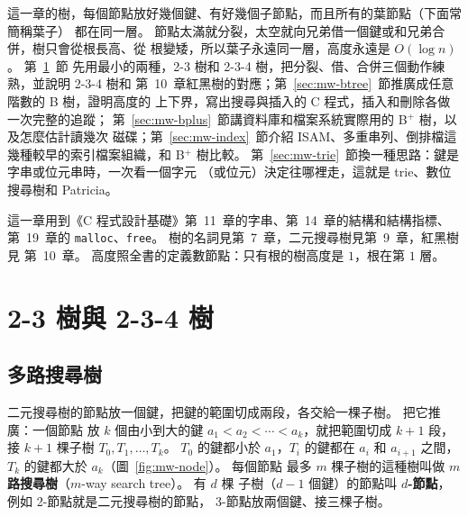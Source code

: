 這一章的樹，每個節點放好幾個鍵、有好幾個子節點，而且所有的葉節點（下面常簡稱葉子）
都在同一層。 節點太滿就分裂，太空就向兄弟借一個鍵或和兄弟合併，樹只會從根長高、從
根變矮，所以葉子永遠同一層，高度永遠是 $O(\log n)$。 第~\ref{sec:mw-23}~節
先用最小的兩種，2-3 樹和 2-3-4 樹，把分裂、借、合併三個動作練熟，並說明 2-3-4 樹和
第~10~章紅黑樹的對應；第~\ref{sec:mw-btree}~節推廣成任意階數的 B 樹，證明高度的
上下界，寫出搜尋與插入的 C 程式，插入和刪除各做一次完整的追蹤；
第~\ref{sec:mw-bplus}~節講資料庫和檔案系統實際用的 B$^{+}$ 樹，以及怎麼估計讀幾次
磁碟；第~\ref{sec:mw-index}~節介紹 ISAM、多重串列、倒排檔這幾種較早的索引檔案組織，和
B$^{+}$ 樹比較。 第~\ref{sec:mw-trie}~節換一種思路：鍵是字串或位元串時，一次看一個字元
（或位元）決定往哪裡走，這就是 trie、數位搜尋樹和 Patricia。

這一章用到《C 程式設計基礎》第~11~章的字串、第~14~章的結構和結構指標、第~19~章的
\texttt{malloc}、\texttt{free}。 樹的名詞見第~7~章，二元搜尋樹見第~9~章，紅黑樹見
第~10~章。 高度照全書的定義數節點：只有根的樹高度是 $1$，根在第 $1$ 層。

\section{2-3 樹與 2-3-4 樹}
\label{sec:mw-23}

\subsection{多路搜尋樹}

二元搜尋樹的節點放一個鍵，把鍵的範圍切成兩段，各交給一棵子樹。 把它推廣：一個節點
放 $k$ 個由小到大的鍵 $a_1 < a_2 < \cdots < a_k$，就把範圍切成 $k + 1$ 段，接
$k + 1$ 棵子樹 $T_0, T_1, \ldots, T_k$。 $T_0$ 的鍵都小於 $a_1$，$T_i$ 的鍵都在
$a_i$ 和 $a_{i+1}$ 之間，$T_k$ 的鍵都大於 $a_k$（圖~\ref{fig:mw-node}）。 每個節點
最多 $m$ 棵子樹的這種樹叫做 \textbf{$m$ 路搜尋樹}（$m$-way search tree）。 有 $d$ 棵
子樹（$d - 1$ 個鍵）的節點叫 \textbf{$d$-節點}，例如 2-節點就是二元搜尋樹的節點，
3-節點放兩個鍵、接三棵子樹。

\begin{center}
\label{fig:mw-node}
\end{center}

